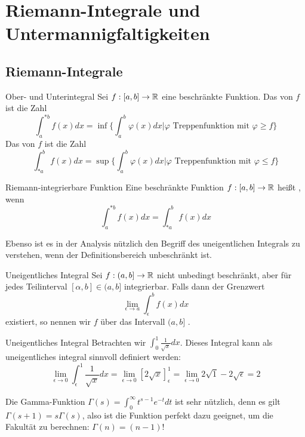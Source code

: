 \newpage
\section[Wiederholung]{Riemann-Integrale und Untermannigfaltigkeiten}
\subsection{Riemann-Integrale}\label{ssec:Riemann-Integrale}
\begin{Def}
{Ober- und Unterintegral}
Sei $f:[a,b]\rightarrow \mathbb{R}$ eine beschränkte Funktion. Das  von $f$ ist die Zahl
$$\int_a^{*b}f(x)dx=\inf \{ \int_a^b \varphi(x)dx | \varphi \text{ Treppenfunktion mit } \varphi\geq f \} $$
Das  von $f$ ist die Zahl
$$\int_{*a}^{b}f(x)dx=\sup \{ \int_a^b \varphi(x)dx | \varphi \text{ Treppenfunktion mit } \varphi\leq f \} $$
\end{Def}

\begin{Def}
{Riemann-integrierbare Funktion}
Eine beschränkte Funktion $f:[a,b]\rightarrow \mathbb{R}$ heißt , wenn $$\int_a^{*b}f(x)dx=\int_{*a}^bf(x)dx$$
\end{Def}
Ebenso ist es in der Analysis nützlich den Begriff des uneigentlichen Integrals zu verstehen, wenn der Definitionsbereich unbeschränkt ist.
\begin{Def}
{Uneigentliches Integral}
Sei $f:(a,b]\rightarrow \mathbb{R}$ nicht unbedingt beschränkt, aber für jedes Teilinterval $[\alpha, b] \in (a,b]$ integrierbar. Falls dann der Grenzwert
$$\lim_{\epsilon\rightarrow a}\int_\epsilon^{b} f(x)dx$$ existiert, so nennen wir $f$ über das Intervall $(a,b]$ .
\end{Def}
\begin{Beispiel}
{Uneigentliches Integral}
Betrachten wir $\int_0^1 \frac{1}{\sqrt{x}}dx$. Dieses Integral kann als uneigentliches integral sinnvoll definiert werden:
$$\lim_{\epsilon\rightarrow 0}\int_\epsilon^1 \frac{1}{\sqrt{x}} dx =\lim_{\epsilon\rightarrow 0} [2\sqrt{x}]_\epsilon^1=\lim_{\epsilon\rightarrow 0}2\sqrt{1}-2\sqrt{\epsilon}=2$$
\end{Beispiel}
Die Gamma-Funktion $\Gamma(s)=\int_0^\infty t^{s-1}e^{-t}dt$ ist sehr nützlich, denn es gilt $\Gamma(s+1)=s\Gamma(s)$, also ist die Funktion perfekt dazu geeignet, um die Fakultät zu berechnen: $\Gamma(n)=(n-1)!$

